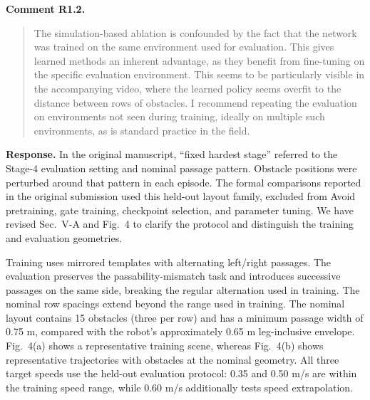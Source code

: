 \documentclass[letterpaper,11pt]{article}
\begin{document}
\noindent\textbf{Comment R1.2.}
\begin{quote}\color{reviewgray}
The simulation-based ablation is confounded by the fact that the network was trained on the same environment used for evaluation. This gives learned methods an inherent advantage, as they benefit from fine-tuning on the specific evaluation environment. This seems to be particularly visible in the accompanying video, where the learned policy seems overfit to the distance between rows of obstacles. I recommend repeating the evaluation on environments not seen during training, ideally on multiple such environments, as is standard practice in the field.
\end{quote}
\noindent\textbf{Response.}
In the original manuscript, ``fixed hardest stage'' referred to the Stage-4 evaluation setting and nominal passage pattern. Obstacle positions were perturbed around that pattern in each episode. The formal comparisons reported in the original submission used this held-out layout family, excluded from Avoid pretraining, gate training, checkpoint selection, and parameter tuning. We have revised Sec.~V-A and Fig.~4 to clarify the protocol and distinguish the training and evaluation geometries.

Training uses mirrored templates with alternating left/right passages. The evaluation preserves the passability-mismatch task and introduces successive passages on the same side, breaking the regular alternation used in training. The nominal row spacings extend beyond the range used in training. The nominal layout contains 15 obstacles (three per row) and has a minimum passage width of 0.75 m, compared with the robot's approximately 0.65 m leg-inclusive envelope. Fig.~4(a) shows a representative training scene, whereas Fig.~4(b) shows representative trajectories with obstacles at the nominal geometry. All three target speeds use the held-out evaluation protocol: 0.35 and 0.50 m/s are within the training speed range, while 0.60 m/s additionally tests speed extrapolation.
\par\nopagebreak[4]
\end{document}
